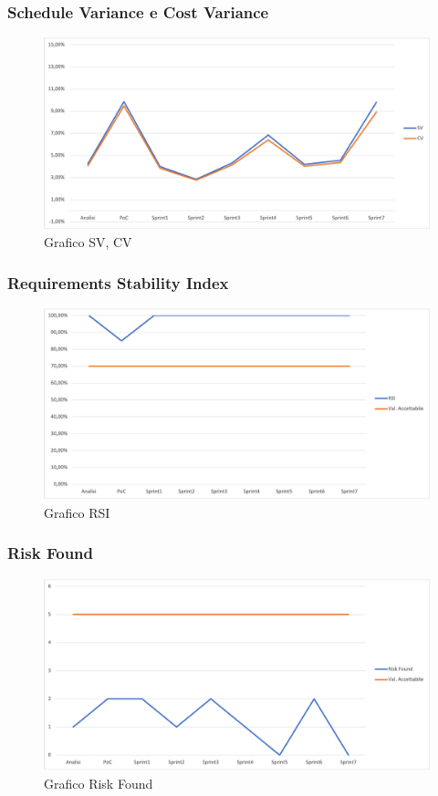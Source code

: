 \subsubsection{Schedule Variance e Cost Variance}
\begin{figure}[H]
\centering
\includegraphics[width=1\textwidth]{src/img/SVCV.png}
\caption{Grafico SV, CV}
\end{figure}

\subsubsection{Requirements Stability Index}
\begin{figure}[H]
\centering
\includegraphics[width=1\textwidth]{src/img/RSI.png}
\caption{Grafico RSI}
\end{figure}

\subsubsection{Risk Found}

\begin{figure}[H]
\centering
\includegraphics[width=1\textwidth]{src/img/riskFound.png}
\caption{Grafico Risk Found}
\end{figure}

